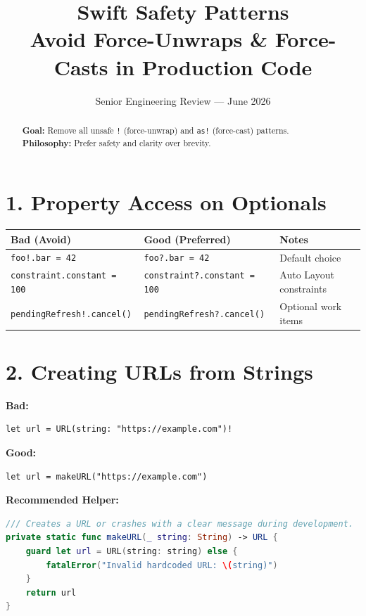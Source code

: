 \documentclass[11pt,a4paper]{article}
\title{\textbf{Swift Safety Patterns}\\[0.3em]
\large Avoid Force-Unwraps \& Force-Casts in Production Code}
\author{Senior Engineering Review — June 2026}
\date{}
\begin{document}
\maketitle

\begin{abstract}
\noindent\textbf{Goal:} Remove all unsafe \texttt{!} (force-unwrap) and \texttt{as!} (force-cast) patterns.\\
\textbf{Philosophy:} Prefer safety and clarity over brevity.
\end{abstract}

\section{1. Property Access on Optionals}

\begin{tabular}{@{}p{5.5cm}p{5.5cm}l@{}}
\toprule
\textbf{Bad (Avoid)} & \textbf{Good (Preferred)} & \textbf{Notes} \\
\midrule
\texttt{foo!.bar = 42} & \texttt{foo?.bar = 42} & Default choice \\
\texttt{constraint.constant = 100} & \texttt{constraint?.constant = 100} & Auto Layout constraints \\
\texttt{pendingRefresh!.cancel()} & \texttt{pendingRefresh?.cancel()} & Optional work items \\
\bottomrule
\end{tabular}

\section{2. Creating URLs from Strings}

\textbf{Bad:}
\begin{lstlisting}
let url = URL(string: "https://example.com")!
\end{lstlisting}

\textbf{Good:}
\begin{lstlisting}
let url = makeURL("https://example.com")
\end{lstlisting}

\textbf{Recommended Helper:}
\begin{lstlisting}[language=Swift]
/// Creates a URL or crashes with a clear message during development.
private static func makeURL(_ string: String) -> URL {
    guard let url = URL(string: string) else {
        fatalError("Invalid hardcoded URL: \(string)")
    }
    return url
}
\end{lstlisting}
\end{document}
